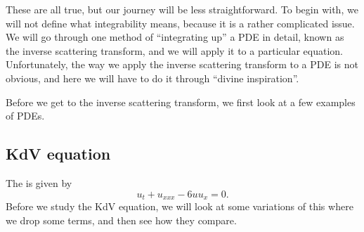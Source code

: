 \documentclass[a4paper]{article}
\begin{document}
These are all true, but our journey will be less straightforward. To begin with, we will not define what integrability means, because it is a rather complicated issue. We will go through one method of ``integrating up'' a PDE in detail, known as the inverse scattering transform, and we will apply it to a particular equation. Unfortunately, the way we apply the inverse scattering transform to a PDE is not obvious, and here we will have to do it through ``divine inspiration''.

Before we get to the inverse scattering transform, we first look at a few examples of PDEs.

\subsection{KdV equation}
The  is given by
\[
  u_t + u_{xxx} - 6 u u_x = 0.
\]
Before we study the KdV equation, we will look at some variations of this where we drop some terms, and then see how they compare.
\end{document}

